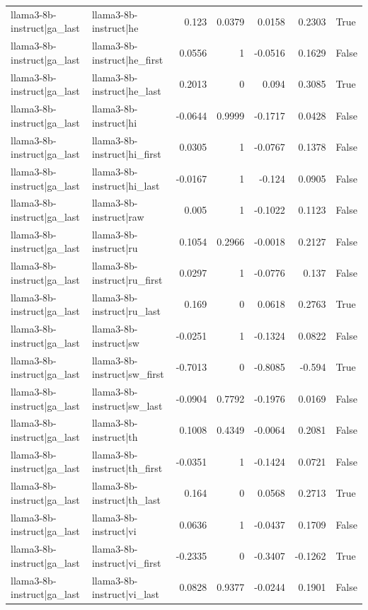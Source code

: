 \begin{table}
\begin{tabular}{l l r r r r l}
llama3-8b-instruct|ga_last & llama3-8b-instruct|he & 0.123 & 0.0379 & 0.0158 & 0.2303 & True \\
llama3-8b-instruct|ga_last & llama3-8b-instruct|he_first & 0.0556 & 1 & -0.0516 & 0.1629 & False \\
llama3-8b-instruct|ga_last & llama3-8b-instruct|he_last & 0.2013 & 0 & 0.094 & 0.3085 & True \\
llama3-8b-instruct|ga_last & llama3-8b-instruct|hi & -0.0644 & 0.9999 & -0.1717 & 0.0428 & False \\
llama3-8b-instruct|ga_last & llama3-8b-instruct|hi_first & 0.0305 & 1 & -0.0767 & 0.1378 & False \\
llama3-8b-instruct|ga_last & llama3-8b-instruct|hi_last & -0.0167 & 1 & -0.124 & 0.0905 & False \\
llama3-8b-instruct|ga_last & llama3-8b-instruct|raw & 0.005 & 1 & -0.1022 & 0.1123 & False \\
llama3-8b-instruct|ga_last & llama3-8b-instruct|ru & 0.1054 & 0.2966 & -0.0018 & 0.2127 & False \\
llama3-8b-instruct|ga_last & llama3-8b-instruct|ru_first & 0.0297 & 1 & -0.0776 & 0.137 & False \\
llama3-8b-instruct|ga_last & llama3-8b-instruct|ru_last & 0.169 & 0 & 0.0618 & 0.2763 & True \\
llama3-8b-instruct|ga_last & llama3-8b-instruct|sw & -0.0251 & 1 & -0.1324 & 0.0822 & False \\
llama3-8b-instruct|ga_last & llama3-8b-instruct|sw_first & -0.7013 & 0 & -0.8085 & -0.594 & True \\
llama3-8b-instruct|ga_last & llama3-8b-instruct|sw_last & -0.0904 & 0.7792 & -0.1976 & 0.0169 & False \\
llama3-8b-instruct|ga_last & llama3-8b-instruct|th & 0.1008 & 0.4349 & -0.0064 & 0.2081 & False \\
llama3-8b-instruct|ga_last & llama3-8b-instruct|th_first & -0.0351 & 1 & -0.1424 & 0.0721 & False \\
llama3-8b-instruct|ga_last & llama3-8b-instruct|th_last & 0.164 & 0 & 0.0568 & 0.2713 & True \\
llama3-8b-instruct|ga_last & llama3-8b-instruct|vi & 0.0636 & 1 & -0.0437 & 0.1709 & False \\
llama3-8b-instruct|ga_last & llama3-8b-instruct|vi_first & -0.2335 & 0 & -0.3407 & -0.1262 & True \\
llama3-8b-instruct|ga_last & llama3-8b-instruct|vi_last & 0.0828 & 0.9377 & -0.0244 & 0.1901 & False \\

\end{tabular}
\end{table}
